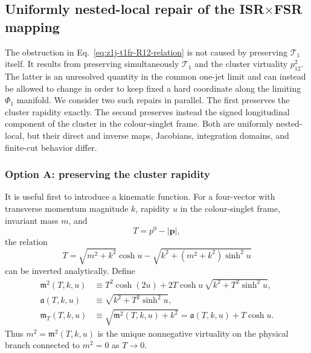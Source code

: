 \documentclass[11pt]{article}
\newcommand{\Ph}{\Phi}
\begin{document}
\subsection{Uniformly nested-local repair of the \texorpdfstring{ISR$\times$FSR}{ISR x FSR} mapping}
\label{subsec:z1j-isrfsr-mapping-repair}

The obstruction in Eq.~\eqref{eq:z1j-t1fr-R12-relation} is not caused by preserving
$\mathcal T_1$ itself.  It results from preserving simultaneously $\mathcal T_1$ and the cluster virtuality
$p_{12}^2$.  The latter is an unresolved quantity in the common one-jet limit and can instead be allowed to
change in order to keep fixed a hard coordinate along the limiting $\Ph_1$ manifold.  We consider two such
repairs in parallel.  The first preserves the cluster rapidity exactly.  The second preserves instead the
signed longitudinal component of the cluster in the colour-singlet frame.  Both are uniformly nested-local,
but their direct and inverse maps, Jacobians, integration domains, and finite-cut behavior differ.

\subsubsection{Option A: preserving the cluster rapidity}
\label{subsubsec:z1j-isrfsr-rapidity-repair}

It is useful first to introduce a kinematic function.  For a four-vector with transverse momentum magnitude
$k$, rapidity $u$ in the colour-singlet frame, invariant mass $m$, and
\begin{equation}
T=p^0-|\boldsymbol p|,
\label{eq:isrfsr-repair-T-definition}
\end{equation}
the relation
\begin{equation}
T
=
\sqrt{m^2+k^2}\cosh u
-
\sqrt{k^2+(m^2+k^2)\sinh^2u}
\label{eq:isrfsr-repair-T-mass-relation}
\end{equation}
can be inverted analytically. Define
\begin{align}
\mathfrak m^2(T,k,u)
&\equiv
T^2\cosh(2u)
+2T\cosh u\,
\sqrt{k^2+T^2\sinh^2u},
\label{eq:isrfsr-repair-mass-function}
\\
\mathfrak a(T,k,u)
&\equiv
\sqrt{k^2+T^2\sinh^2u},
\label{eq:isrfsr-repair-a-function}
\\
\mathfrak m_T(T,k,u)
&\equiv
\sqrt{\mathfrak m^2(T,k,u)+k^2}
=\mathfrak a(T,k,u)+T\cosh u.
\label{eq:isrfsr-repair-mt-function}
\end{align}
Thus $m^2=\mathfrak m^2(T,k,u)$ is the unique nonnegative virtuality on the physical branch connected to
$m^2=0$ as $T\to0$.
\end{document}

